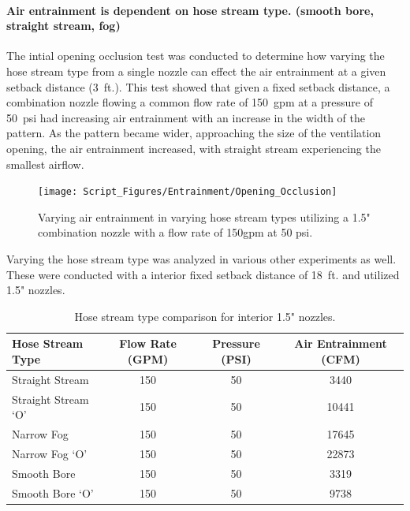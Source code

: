 \documentclass{article}
\begin{document}
\clearpage

\paragraph{Air entrainment is dependent on hose stream type. (smooth bore, straight stream, fog)} \mbox{}

The intial opening occlusion test was conducted to determine how varying the hose stream type from a single nozzle can effect the air entrainment at a given setback distance (3~ft.). This test showed that given a fixed setback distance, a combination nozzle flowing a common flow rate of 150~gpm at a pressure of 50~psi had increasing air entrainment with an increase in the width of the pattern. As the pattern became wider, approaching the size of the ventilation opening, the air entrainment increased, with straight stream experiencing the smallest airflow. 

\begin{figure}[!ht]
	\centering
	\texttt{[image: Script\_Figures/Entrainment/Opening\_Occlusion]}
	\caption{Varying air entrainment in varying hose stream types utilizing a 1.5" combination nozzle with a flow rate of 150gpm at 50 psi.}
	\label{fig:Opening_Occlusion}
\end{figure}

Varying the hose stream type was analyzed in various other experiments as well. These were conducted with a interior fixed setback distance of 18~ft. and utilized 1.5" nozzles.


\begin{table}[!ht]
\centering
\caption{Hose stream type comparison for interior 1.5" nozzles.}
\label{Hose_Stream_Type_Comparison}
\begin{tabular}{lccc}
\toprule[1.5pt]
{\textbf{Hose Stream Type}} & {\textbf{Flow Rate (GPM)}} & {\textbf{Pressure (PSI)}} & \textbf{Air Entrainment (CFM)} \\ 
\midrule
Straight Stream & 150 & 50 & 3440 \\
Straight Stream `O' & 150 & 50 & 10441 \\
Narrow Fog & 150 & 50 & 17645 \\
Narrow Fog `O' & 150 & 50 & 22873 \\
Smooth Bore & 150 & 50 & 3319 \\
Smooth Bore `O' & 150 & 50 & 9738 \\ 
\bottomrule[1.25pt]
\end{tabular}
\end{table}
\end{document}
